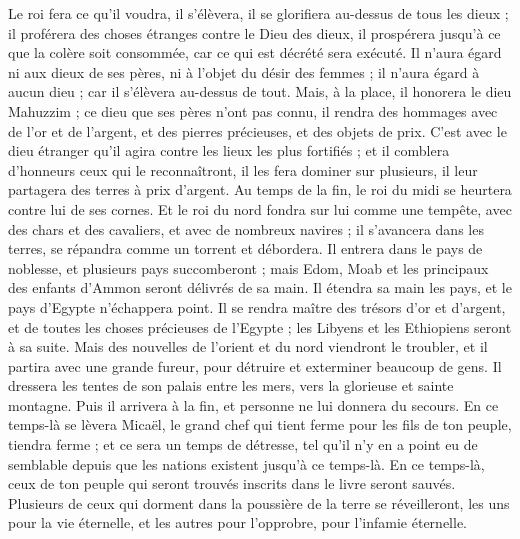\begin{multicols}{2}
Le roi fera ce qu’il voudra, il s’élèvera, il se glorifiera au-dessus de tous les dieux ; il proférera des choses étranges contre le Dieu des dieux, il prospérera jusqu'à ce que la colère soit consommée,  car ce qui est décrété sera exécuté.
Il n’aura égard ni aux dieux de ses pères, ni à l’objet du désir des femmes ; il n’aura égard à aucun dieu ; car il s'élèvera au-dessus de tout.
Mais, à la place, il honorera le dieu Mahuzzim ; ce dieu que ses pères n'ont pas connu, il rendra des hommages avec de l'or et de l'argent, et des pierres précieuses, et des objets de prix.
C’est avec le dieu étranger qu’il agira contre les lieux les plus fortifiés ; et il comblera d’honneurs ceux qui le reconnaîtront, il les fera dominer sur plusieurs, il leur partagera des terres à prix d’argent.
Au temps de la fin, le roi du midi se heurtera contre lui de ses cornes. Et le roi du nord fondra sur lui comme une tempête, avec des chars et des cavaliers, et avec de nombreux navires ; il s’avancera dans les terres, se répandra comme un torrent et débordera.
Il entrera dans le pays de noblesse, et plusieurs pays succomberont ; mais Edom, Moab et les principaux des enfants d’Ammon seront délivrés de sa main.
Il étendra sa main les pays, et le pays d'Egypte n'échappera point.
Il se rendra maître des trésors d'or et d'argent, et de toutes les choses précieuses de l'Egypte ; les Libyens et les Ethiopiens seront à sa suite.
Mais des nouvelles de l'orient et du nord viendront le troubler, et il partira avec une grande fureur, pour détruire et exterminer beaucoup de gens.
Il dressera les tentes de son palais entre les mers, vers la glorieuse et sainte montagne. Puis il arrivera à la fin, et personne ne lui donnera du secours.
\VerseOne{}En ce temps-là se lèvera Micaël, le grand chef qui tient ferme pour les fils de ton peuple, tiendra ferme ; et ce sera un temps de détresse, tel qu'il n'y en a point eu de semblable depuis que les nations existent jusqu’à ce temps-là. En ce temps-là, ceux de ton peuple qui seront trouvés inscrits dans le livre seront sauvés.
Plusieurs de ceux qui dorment dans la poussière de la terre se réveilleront, les uns pour la vie éternelle, et les autres pour l’opprobre, pour l'infamie éternelle.

\end{multicols}
